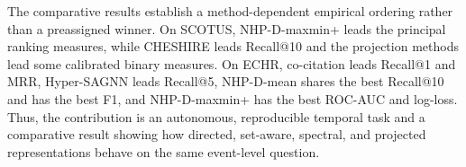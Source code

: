 \documentclass{svproc}
\begin{document}
The comparative results establish a method-dependent empirical ordering rather than a preassigned winner. On SCOTUS, NHP-D-maxmin+ leads the principal ranking measures, while CHESHIRE leads Recall@10 and the projection methods lead some calibrated binary measures. On ECHR, co-citation leads Recall@1 and MRR, Hyper-SAGNN leads Recall@5, NHP-D-mean shares the best Recall@10 and has the best F1, and NHP-D-maxmin+ has the best ROC-AUC and log-loss. Thus, the contribution is an autonomous, reproducible temporal task and a comparative result showing how directed, set-aware, spectral, and projected representations behave on the same event-level question.



\end{document}
